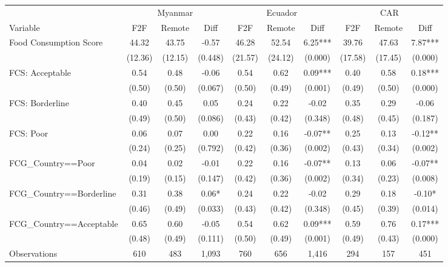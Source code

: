 \begin{tabular}{l*{9}c}
\hline\hline
 & \multicolumn{3}{c}{Myanmar} & \multicolumn{3}{c}{Ecuador} & \multicolumn{3}{c}{CAR}\\ 
Variable & F2F & Remote & Diff & F2F & Remote & Diff & F2F & Remote & Diff \\
\hline
Food Consumption Score&44.32&43.75&-0.57&46.28&52.54&6.25***&39.76&47.63&7.87***\\
&(12.36)&(12.15)&(0.448)&(21.57)&(24.12)&(0.000)&(17.58)&(17.45)&(0.000)\\
FCS: Acceptable&0.54&0.48&-0.06&0.54&0.62&0.09***&0.40&0.58&0.18***\\
&(0.50)&(0.50)&(0.067)&(0.50)&(0.49)&(0.001)&(0.49)&(0.50)&(0.000)\\
FCS: Borderline&0.40&0.45&0.05&0.24&0.22&-0.02&0.35&0.29&-0.06\\
&(0.49)&(0.50)&(0.086)&(0.43)&(0.42)&(0.348)&(0.48)&(0.45)&(0.187)\\
FCS: Poor&0.06&0.07&0.00&0.22&0.16&-0.07**&0.25&0.13&-0.12**\\
&(0.24)&(0.25)&(0.792)&(0.42)&(0.36)&(0.002)&(0.43)&(0.34)&(0.002)\\
FCG\_Country==Poor&0.04&0.02&-0.01&0.22&0.16&-0.07**&0.13&0.06&-0.07**\\
&(0.19)&(0.15)&(0.147)&(0.42)&(0.36)&(0.002)&(0.34)&(0.23)&(0.008)\\
FCG\_Country==Borderline&0.31&0.38&0.06*&0.24&0.22&-0.02&0.29&0.18&-0.10*\\
&(0.46)&(0.49)&(0.033)&(0.43)&(0.42)&(0.348)&(0.45)&(0.39)&(0.014)\\
FCG\_Country==Acceptable&0.65&0.60&-0.05&0.54&0.62&0.09***&0.59&0.76&0.17***\\
&(0.48)&(0.49)&(0.111)&(0.50)&(0.49)&(0.001)&(0.49)&(0.43)&(0.000)\\
\hline
Observations & 610 & 483 & 1,093 & 760 & 656 & 1,416 & 294 & 157 & 451 \\
\hline\hline
\end{tabular}
